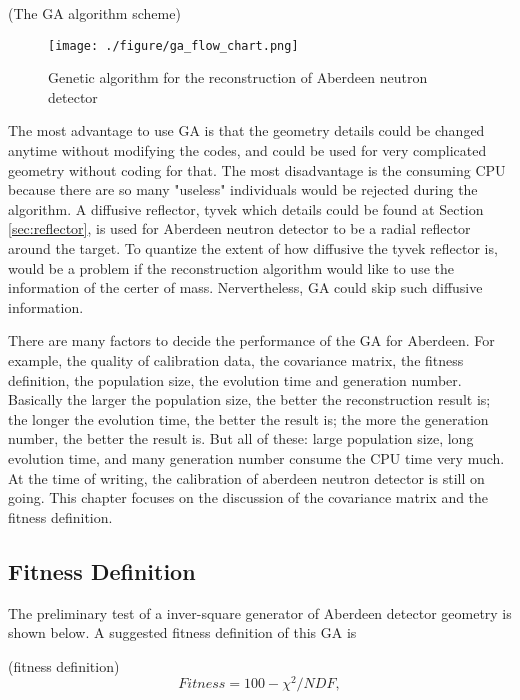 (The GA algorithm scheme)
\begin{figure}[h]
    \centering
    \texttt{[image: ./figure/ga\_flow\_chart.png]}
    \caption{Genetic algorithm for the reconstruction of Aberdeen neutron detector}
    \label{ga_flow_chart.png}
    \end{figure}


The most advantage to use GA is that the geometry details could be changed anytime without modifying the codes,
and could be used for very complicated geometry without coding for that. The most disadvantage is the consuming
CPU because there are so many "useless" individuals would be rejected during the algorithm.
A diffusive reflector, tyvek which details could be found at Section \ref{sec:reflector}, is used for Aberdeen neutron detector to
be a radial reflector around the target. To quantize the extent of how diffusive the tyvek reflector is, would be a problem
if the reconstruction algorithm would like to use the information of the certer of mass.
Nervertheless, GA could skip such diffusive information.


There are many factors to decide the performance of the GA for Aberdeen.
For example, the quality of calibration data, the covariance matrix, the fitness definition,
the population size, the evolution time and generation number.
Basically the larger the population size, the better the reconstruction result is; the longer the evolution time, the better the result is;
the more the generation number, the better the result is. But all of these: large population size, long evolution time, and many generation
number consume the CPU time very much.
At the time of writing, the calibration of aberdeen neutron detector is still on going.
This chapter focuses on the discussion of the covariance matrix and the fitness definition.














\subsection{Fitness Definition}

The preliminary test of a inver-square generator of Aberdeen
detector geometry is shown below. A suggested fitness definition of this GA is


(fitness definition)
\begin{equation}
\label{fitness}
Fitness = 100 - \chi^{2}/NDF,
\end{equation}


